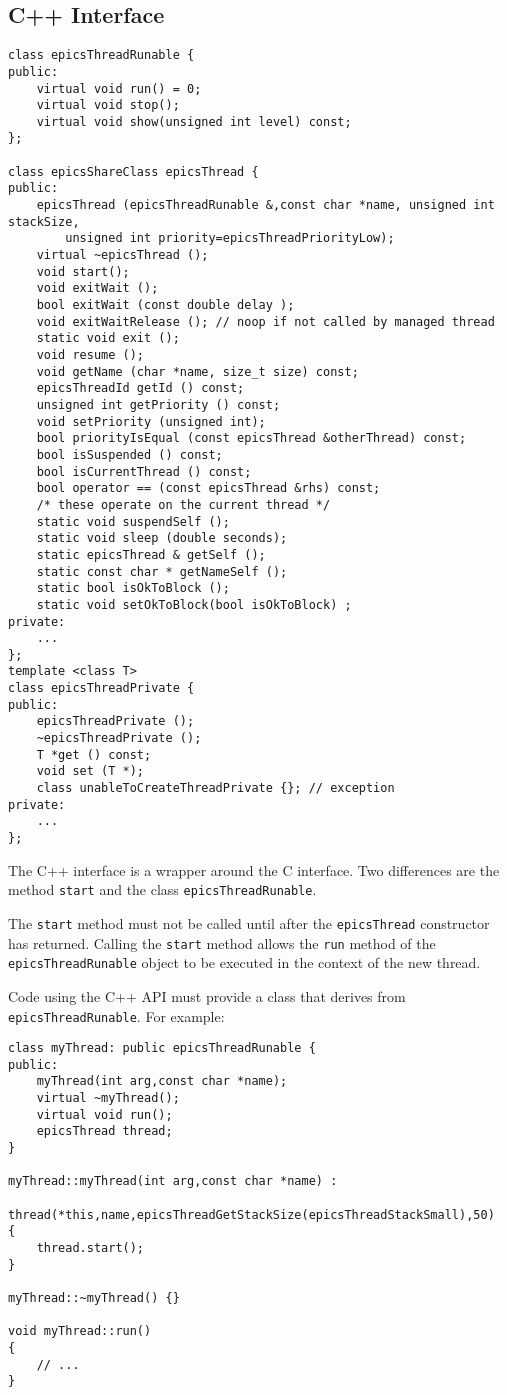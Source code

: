 \subsection{C++ Interface}

\begin{verbatim}
class epicsThreadRunable {
public:
    virtual void run() = 0;
    virtual void stop();
    virtual void show(unsigned int level) const;
};

class epicsShareClass epicsThread {
public:
    epicsThread (epicsThreadRunable &,const char *name, unsigned int stackSize,
        unsigned int priority=epicsThreadPriorityLow);
    virtual ~epicsThread ();
    void start();
    void exitWait ();
    bool exitWait (const double delay );
    void exitWaitRelease (); // noop if not called by managed thread
    static void exit ();
    void resume ();
    void getName (char *name, size_t size) const;
    epicsThreadId getId () const;
    unsigned int getPriority () const;
    void setPriority (unsigned int);
    bool priorityIsEqual (const epicsThread &otherThread) const;
    bool isSuspended () const;
    bool isCurrentThread () const;
    bool operator == (const epicsThread &rhs) const;
    /* these operate on the current thread */
    static void suspendSelf ();
    static void sleep (double seconds);
    static epicsThread & getSelf ();
    static const char * getNameSelf ();
    static bool isOkToBlock ();
    static void setOkToBlock(bool isOkToBlock) ;
private:
    ...
};
template <class T>
class epicsThreadPrivate {
public:
    epicsThreadPrivate ();
    ~epicsThreadPrivate ();
    T *get () const;
    void set (T *);
    class unableToCreateThreadPrivate {}; // exception
private:
    ...
};
\end{verbatim}

The C++ interface is a wrapper around the C interface.
Two differences are the method \verb|start| and the class 
\verb|epicsThreadRunable|.

The \verb|start| method must not be called until after the \verb|epicsThread| constructor has returned.
Calling the \verb|start| method allows the \verb|run| method of the \verb|epicsThreadRunable| object to be executed in the context of the new thread.

Code using the C++ API must provide a class that derives from \verb|epicsThreadRunable|.
For example:

\begin{verbatim}
class myThread: public epicsThreadRunable {
public:
    myThread(int arg,const char *name);
    virtual ~myThread();
    virtual void run();
    epicsThread thread;
}

myThread::myThread(int arg,const char *name) :
    thread(*this,name,epicsThreadGetStackSize(epicsThreadStackSmall),50)
{
    thread.start();
}

myThread::~myThread() {}

void myThread::run()
{
    // ...
}
\end{verbatim}

